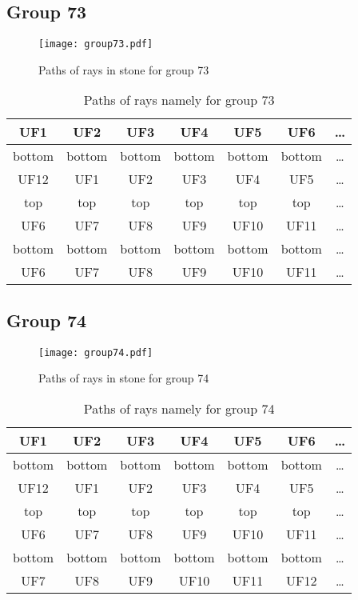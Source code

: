 \subsection*{Group 73}






\begin{figure}[h!]
\centering
\texttt{[image: group73.pdf]}
\caption{Paths of rays in stone for group 73}
\label{table:FigGroup73}
\end{figure}



\begin{table}[h!]
\centering
\begin{tabular}{|c|c|c|c|c|c|c|}
\hline
UF1 & UF2 & UF3 & UF4 & UF5 & UF6 & \dots \\
\hline
bottom & bottom & bottom & bottom & bottom & bottom & \dots \\
\hline
UF12 & UF1 & UF2 & UF3 & UF4 & UF5 & \dots \\
\hline
top & top & top & top & top & top & \dots \\
\hline
UF6 & UF7 & UF8 & UF9 & UF10 & UF11 & \dots \\
\hline
bottom & bottom & bottom & bottom & bottom & bottom & \dots \\
\hline
UF6 & UF7 & UF8 & UF9 & UF10 & UF11 & \dots \\
\hline
\end{tabular}
\caption{Paths of rays namely for group 73}
\label{table:TableGroup73}
\end{table}
\newpage
\subsection*{Group 74}






\begin{figure}[h!]
\centering
\texttt{[image: group74.pdf]}
\caption{Paths of rays in stone for group 74}
\label{table:FigGroup74}
\end{figure}



\begin{table}[h!]
\centering
\begin{tabular}{|c|c|c|c|c|c|c|}
\hline
UF1 & UF2 & UF3 & UF4 & UF5 & UF6 & \dots \\
\hline
bottom & bottom & bottom & bottom & bottom & bottom & \dots \\
\hline
UF12 & UF1 & UF2 & UF3 & UF4 & UF5 & \dots \\
\hline
top & top & top & top & top & top & \dots \\
\hline
UF6 & UF7 & UF8 & UF9 & UF10 & UF11 & \dots \\
\hline
bottom & bottom & bottom & bottom & bottom & bottom & \dots \\
\hline
UF7 & UF8 & UF9 & UF10 & UF11 & UF12 & \dots \\
\hline
\end{tabular}
\caption{Paths of rays namely for group 74}
\label{table:TableGroup74}
\end{table}
\newpage
